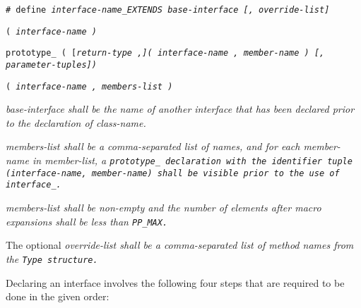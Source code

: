 
\tt{# define} \it{interface-name}\tt{_EXTENDS}
\it{base-interface} [\tt{,} \it{override-list}]

 \tt{(} \it{interface-name} \tt{)}

\tt{prototype_} \tt{(} [\it{return-type} \tt{,}]\s\tt{(} \it{interface-name}
\tt{,} \it{member-name} \tt{)} [\tt{,} \it{parameter-tuples}]\s\tt{)}

 \tt{(} \it{interface-name} \tt{,} \it{members-list} \tt{)}


\it{base-interface} shall be the name of another interface that
has been declared prior to the declaration of \it{class-name}.

\it{members-list} shall be a comma-separated list of names, and for each
\it{member-name} in \it{member-list}, a \tt{prototype_} declaration with the
identifier tuple \tt{(}\it{interface-name}\tt{,} \it{member-name}\tt{)}
shall be visible prior to the use of \tt{interface_}.

\it{members-list} shall be non-empty and the number of elements
after macro expansions shall be less than \tt{PP_MAX}.

The optional \it{override-list} shall be a comma-separated
list of method names from the \tt{Type} structure.


Declaring an interface involves the following four
steps that are required to be done in the given order:

\enlargethispage*{\baselineskip}
\enlargethispage*{\baselineskip}

